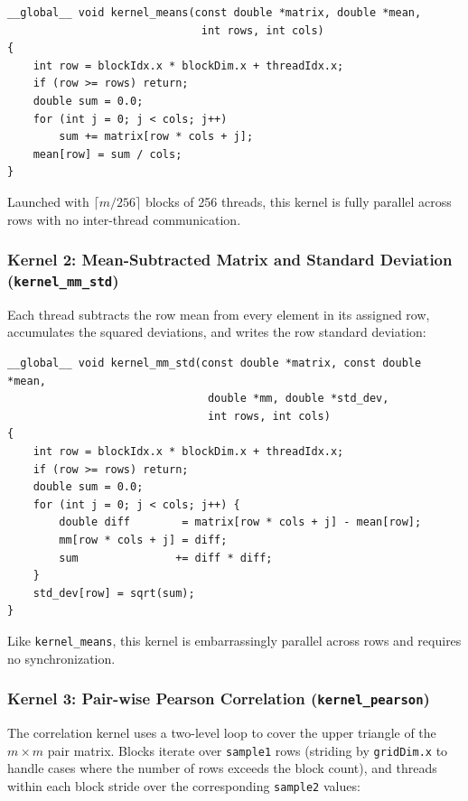 \documentclass[11pt,a4paper]{article}
\begin{document}
\begin{lstlisting}[caption={Row-mean kernel}]
__global__ void kernel_means(const double *matrix, double *mean,
                              int rows, int cols)
{
    int row = blockIdx.x * blockDim.x + threadIdx.x;
    if (row >= rows) return;
    double sum = 0.0;
    for (int j = 0; j < cols; j++)
        sum += matrix[row * cols + j];
    mean[row] = sum / cols;
}
\end{lstlisting}

Launched with $\lceil m / 256 \rceil$ blocks of 256 threads, this kernel is fully parallel across rows with no inter-thread communication.

\subsubsection{Kernel 2: Mean-Subtracted Matrix and Standard Deviation (\texttt{kernel\_mm\_std})}

Each thread subtracts the row mean from every element in its assigned row, accumulates the squared deviations, and writes the row standard deviation:

\begin{lstlisting}[caption={Mean-subtraction and standard deviation kernel}]
__global__ void kernel_mm_std(const double *matrix, const double *mean,
                               double *mm, double *std_dev,
                               int rows, int cols)
{
    int row = blockIdx.x * blockDim.x + threadIdx.x;
    if (row >= rows) return;
    double sum = 0.0;
    for (int j = 0; j < cols; j++) {
        double diff        = matrix[row * cols + j] - mean[row];
        mm[row * cols + j] = diff;
        sum               += diff * diff;
    }
    std_dev[row] = sqrt(sum);
}
\end{lstlisting}

Like \texttt{kernel\_means}, this kernel is embarrassingly parallel across rows and requires no synchronization.

\subsubsection{Kernel 3: Pair-wise Pearson Correlation (\texttt{kernel\_pearson})}

The correlation kernel uses a two-level loop to cover the upper triangle of the $m \times m$ pair matrix. Blocks iterate over \texttt{sample1} rows (striding by \texttt{gridDim.x} to handle cases where the number of rows exceeds the block count), and threads within each block stride over the corresponding \texttt{sample2} values:
\end{document}
